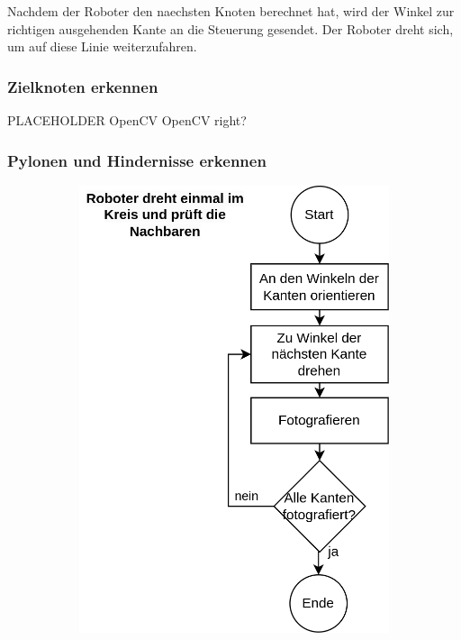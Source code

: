 Nachdem der Roboter den naechsten Knoten berechnet hat, wird der Winkel zur richtigen ausgehenden Kante an die Steuerung gesendet. Der Roboter dreht sich, um auf diese Linie weiterzufahren.

\subsubsection{Zielknoten erkennen}

PLACEHOLDER OpenCV OpenCV right?


\subsubsection{Pylonen und Hindernisse erkennen}

\begin{figure}[H]
\begin{subfigure}{0.45\textwidth}
\includegraphics[width=\textwidth]{assets/gesamtkonzept/ablaufdiagramm-hindernisse-erkennen.png}

\end{subfigure}
\end{figure}
